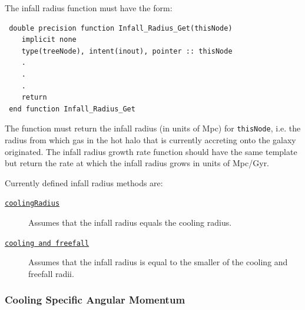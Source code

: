 The infall radius function must have the form:
\begin{verbatim}
 double precision function Infall_Radius_Get(thisNode)
    implicit none
    type(treeNode), intent(inout), pointer :: thisNode
    .
    .
    .
    return
 end function Infall_Radius_Get
\end{verbatim}
The function must return the infall radius (in units of Mpc) for {\tt thisNode}, i.e. the radius from which gas in the hot halo that is currently accreting onto the galaxy originated. The infall radius growth rate function should have the same template but return the rate at which the infall radius grows in units of Mpc/Gyr.

Currently defined infall radius methods are:
\begin{description}
 \item [\hyperlink{cooling.infall_radius.cooling_radius.F90:infall_radii_cooling_radius:infall_radius_cooling_radius}{{\tt coolingRadius}}] Assumes that the infall radius equals the cooling radius.
 \item [\hyperlink{cooling.infall_radius.cooling_and_freefall.F90:infall_radii_cooling_freefall:infall_radius_cooling_freefall}{{\tt cooling and freefall}}] Assumes that the infall radius is equal to the smaller of the cooling and freefall radii.
\end{description}

\subsubsection{Cooling Specific Angular Momentum}

